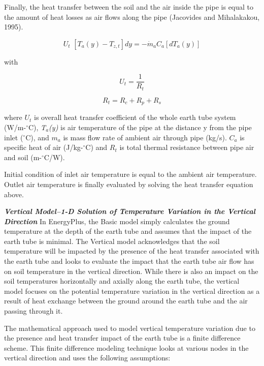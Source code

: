 Finally, the heat transfer between the soil and the air inside the pipe is equal to the amount of heat losses as air flows along the pipe (Jacovides and Mihalakakou, 1995).

\begin{equation}
{U_t}\,\,\left[ {{T_a}(y) - {T_{z,t}}} \right]dy =  - {\dot m_a}{C_a}\left[ {d{T_a}(y)} \right]
\end{equation}

with

\begin{equation}
{U_t} = \frac{1}{{{R_t}}}
\end{equation}

\begin{equation}
{R_t} = {R_c} + {R_p} + {R_s}
\end{equation}

where \(U_{t}\) is overall heat transfer coefficient of the whole earth tube system (W/m-\(^{\circ}\)C), \emph{T\(_{a}\)(y)} is air temperature of the pipe at the distance y from the pipe inlet (\(^{\circ}\)C), and \(m_{a}\) is mass flow rate of ambient air through pipe (kg/s).  \(C_{a}\) is specific heat of air (J/kg-\(^{\circ}\)C) and \(R_{t}\) is total thermal resistance between pipe air and soil (m-\(^{\circ}\)C/W).

Initial condition of inlet air temperature is equal to the ambient air temperature. Outlet air temperature is finally evaluated by solving the heat transfer equation above.

\emph{\textbf{Vertical Model--1-D Solution of Temperature Variation in the Vertical Direction}}
In EnergyPlus, the Basic model simply calculates the ground temperature at the depth of the earth tube and assumes that the impact of the earth tube is minimal. The Vertical model acknowledges that the soil temperature will be impacted by the presence of the heat transfer associated with the earth tube and looks to evaluate the impact that the earth tube air flow has on soil temperature in the vertical direction.  While there is also an impact on the soil temperatures horizontally and axially along the earth tube, the vertical model focuses on the potential temperature variation in the vertical direction as a result of heat exchange between the ground around the earth tube and the air passing through it.

The mathematical approach used to model vertical temperature variation due to the presence and heat transfer impact of the earth tube is a finite difference scheme.  This finite difference modeling technique looks at various nodes in the vertical direction and uses the following assumptions:

